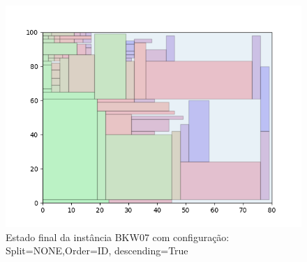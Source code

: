 \begin{figure}[H]
    \centering
    \caption[]{Estado final da instância BKW07 com configuração: Split=NONE,Order=ID, descending=True}
    \label{fig:bkw07-none-id-true}
    \includegraphics[scale=0.5]{output/figures/bkw/bkw07/none/id/true/00}
\end{figure}